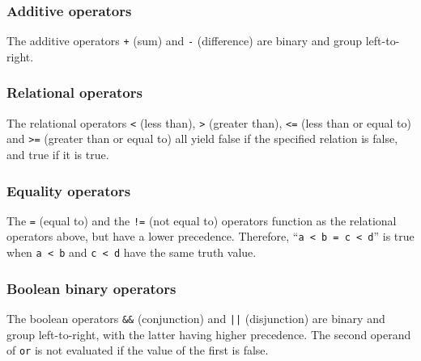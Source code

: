 \begin{alltt}
\quad {} \term{*} 
\quad {} \term{/} 
\quad {} \term{\%} 
\end{alltt}

\subsubsection{Additive operators}
The additive operators \texttt{+} (sum) and \texttt{-} (difference) are binary and group left-to-right.
\begin{alltt}
\quad {} \term{+} 
\quad {} \term{-} 
\end{alltt}

\subsubsection{Relational operators}
The  relational operators \texttt< (less than), \texttt> (greater than), \texttt{<=} (less than or equal to) and \texttt{>=} (greater than or equal to) all yield false if the specified relation is false, and true if it is true.
\begin{alltt}
\quad {} \term{<} 
\quad {} \term{>} 
\quad {} \term{<=} 
\quad {} \term{>=} 
\end{alltt}

\subsubsection{Equality operators}
The \texttt{=} (equal to) and the \texttt{!=} (not equal to) operators function as the relational operators above, but have a lower precedence. Therefore, ``\texttt{a < b = c < d}'' is true when \texttt{a < b} and \texttt{c < d} have the same truth value.
\begin{alltt}
\quad {} \term{=} 
\quad {} \term{!=} 
\end{alltt}

\subsubsection{Boolean binary operators}
The boolean operators \texttt{\&\&} (conjunction) and \texttt{||} (disjunction) are binary and group left-to-right, with the latter having higher precedence. 
The second operand of \texttt{or} is not evaluated if the value of the first is false.
\begin{alltt}
\quad {} \term{\&\&} 
\quad {} \term{||} 
\end{alltt}

